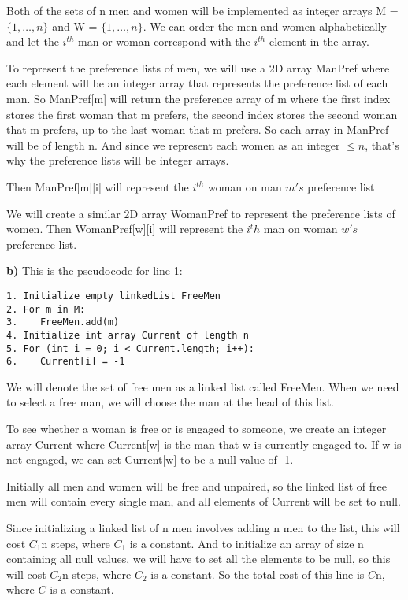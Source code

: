 \documentclass{article}
\begin{document}
Both of the sets of n men and women will be implemented as integer arrays M = $\{1, \dots, n\}$ and W = $\{1, \dots, n\}$. We can order the men and women alphabetically and let the $i^{th}$ man or woman correspond with the $i^{th}$ element in the array. 

To represent the preference lists of men, we will use a 2D array ManPref where each element will be an integer array that represents the preference list of each man. So ManPref[m] will return the preference array of m where the first index stores the first woman that m prefers, the second index stores the second woman that m prefers, up to the last woman that m prefers. So each array in ManPref will be of length n. And since we represent each women as an integer $\leq n$, that's why the preference lists will be integer arrays.

Then ManPref[m][i] will represent the $i^{th}$ woman on man $m's$ preference list

We will create a similar 2D array WomanPref to represent the preference lists of women. Then WomanPref[w][i] will represent the $i^th$ man on woman $w's$ preference list.

\textbf{b)} This is the pseudocode for line 1:
\begin{lstlisting}
1. Initialize empty linkedList FreeMen
2. For m in M:
3.    FreeMen.add(m)
4. Initialize int array Current of length n
5. For (int i = 0; i < Current.length; i++):
6.    Current[i] = -1
\end{lstlisting}

We will denote the set of free men as a linked list called FreeMen. When we need to select a free man, we will choose the man at the head of this list. 

To see whether a woman is free or is engaged to someone, we create an integer array Current where Current[w] is the man that w is currently engaged to. If w is not engaged, we can set Current[w] to be a null value of -1. 

Initially all men and women will be free and unpaired, so the linked list of free men will contain every single man, and all elements of Current will be set to null. 

Since initializing a linked list of n men involves adding n men to the list, this will cost $C_1$n steps, where $C_1$ is a constant.
And to initialize an array of size n containing all null values, we will have to set all the elements to be null, so this will cost $C_2$n steps, where $C_2$ is a constant.
So the total cost of this line is $C$n, where $C$ is a constant.
\end{document}
